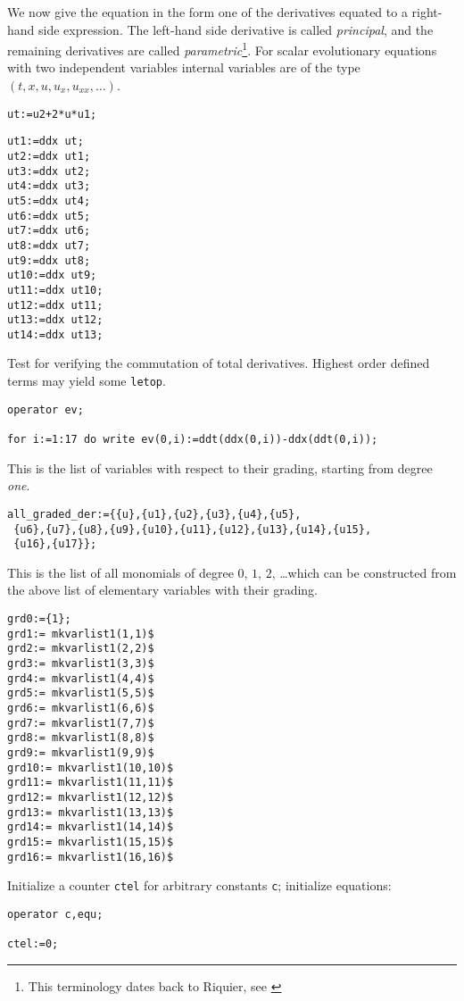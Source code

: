 We now give the equation in the form one of the derivatives equated to a
right-hand side expression. The left-hand side derivative is called
\emph{principal}, and the remaining derivatives are called
\emph{parametric}\footnote{This terminology dates back to Riquier, see
  \cite{Marvan:2009}}.  For scalar
evolutionary equations with two independent variables internal variables are of
the type $(t,x,u,u_x,u_{xx},\ldots)$.
\begin{verbatim}
ut:=u2+2*u*u1;
\end{verbatim}

\begin{verbatim}
ut1:=ddx ut;
ut2:=ddx ut1;
ut3:=ddx ut2;
ut4:=ddx ut3;
ut5:=ddx ut4;
ut6:=ddx ut5;
ut7:=ddx ut6;
ut8:=ddx ut7;
ut9:=ddx ut8;
ut10:=ddx ut9;
ut11:=ddx ut10;
ut12:=ddx ut11;
ut13:=ddx ut12;
ut14:=ddx ut13;
\end{verbatim}

Test for verifying the commutation of total derivatives.
Highest order defined terms may yield some \texttt{letop}.
\begin{verbatim}
operator ev;

for i:=1:17 do write ev(0,i):=ddt(ddx(0,i))-ddx(ddt(0,i));
\end{verbatim}

This is the list of variables with respect to their grading,
starting from degree \emph{one}.
\begin{verbatim}
all_graded_der:={{u},{u1},{u2},{u3},{u4},{u5},
 {u6},{u7},{u8},{u9},{u10},{u11},{u12},{u13},{u14},{u15},
 {u16},{u17}};
\end{verbatim}

This is the list of all monomials of degree $0$, $1$, $2$, \dots which can be
constructed from the above list of elementary variables with their grading.
\begin{verbatim}
grd0:={1};
grd1:= mkvarlist1(1,1)$
grd2:= mkvarlist1(2,2)$
grd3:= mkvarlist1(3,3)$
grd4:= mkvarlist1(4,4)$
grd5:= mkvarlist1(5,5)$
grd6:= mkvarlist1(6,6)$
grd7:= mkvarlist1(7,7)$
grd8:= mkvarlist1(8,8)$
grd9:= mkvarlist1(9,9)$
grd10:= mkvarlist1(10,10)$
grd11:= mkvarlist1(11,11)$
grd12:= mkvarlist1(12,12)$
grd13:= mkvarlist1(13,13)$
grd14:= mkvarlist1(14,14)$
grd15:= mkvarlist1(15,15)$
grd16:= mkvarlist1(16,16)$
\end{verbatim}

Initialize a counter \texttt{ctel} for arbitrary constants \texttt{c};
initialize equations:
\begin{verbatim}
operator c,equ;

ctel:=0;
\end{verbatim}

